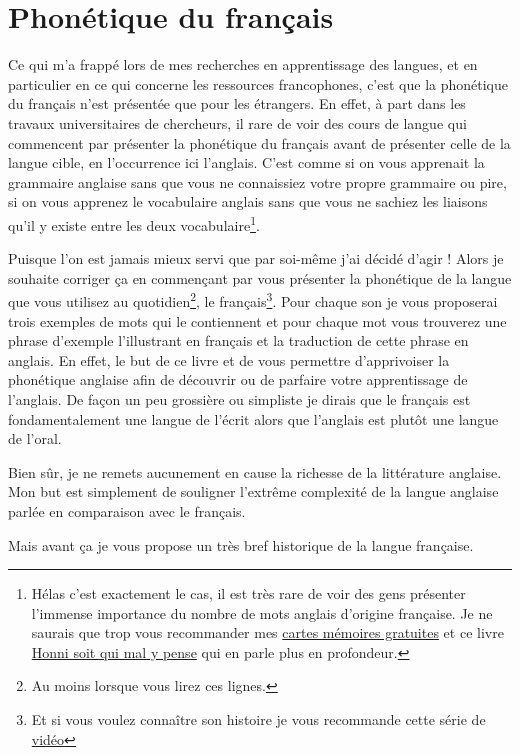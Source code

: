 \documentclass[12pt,a4paper]{book}
\begin{document}
\part{Phonétique du français}
Ce qui m'a frappé lors de mes recherches en apprentissage des langues,
et en particulier en ce qui concerne les ressources francophones,
c'est que la phonétique du français n'est présentée que pour les
étrangers. En effet, à part dans les travaux universitaires de
chercheurs, il rare de voir des cours de langue qui commencent par
présenter la phonétique du français avant de présenter celle de la
langue cible, en l'occurrence ici l'anglais. C'est comme si on vous
apprenait la grammaire anglaise sans que vous ne connaissiez votre
propre grammaire ou pire, si on vous apprenez le vocabulaire anglais
sans que vous ne sachiez les liaisons qu'il y existe entre les deux
vocabulaire\footnote{Hélas c'est exactement le cas, il est très rare
  de voir des gens présenter l'immense importance du nombre de mots
  anglais d'origine française. Je ne saurais que trop vous recommander
mes
\href{https://tinycards.duolingo.com/decks/6VNKUdba/english-words-with-french-origin}{cartes
  mémoires gratuites} et ce livre
\href{https://www.amazon.fr/gp/product/225315444X/ref=as_li_tl?ie=UTF8&camp=1642&creative=6746&creativeASIN=225315444X&linkCode=as2&tag=wwwbecomefree-21&linkId=5317e7b0e063b4d6c7c676b11420e49d}{Honni
  soit qui mal y pense} qui en parle plus en profondeur.}.\par
Puisque l'on est jamais mieux servi que par soi-même j'ai décidé
d'agir ! Alors je souhaite corriger ça en commençant par vous
présenter la phonétique de la langue que vous utilisez au
quotidien\footnote{Au moins lorsque vous lirez ces lignes.}, le
français\footnote{Et si vous voulez connaître son histoire je vous
  recommande cette série de \href{https://www.youtube.com/watch?v=rHSIPt_ehvc&list=PLH2hhYn999aRfv2odG4SozTXCHbZaX_ji}{vidéo}}. Pour
chaque son je vous proposerai trois exemples de mots qui le
contiennent et pour chaque mot vous trouverez une phrase d'exemple
l'illustrant en français et la traduction de cette phrase en
anglais. En effet, le but de ce livre et de vous permettre
d'apprivoiser la phonétique anglaise afin de découvrir ou de parfaire
votre apprentissage de l'anglais. De façon un peu grossière ou
simpliste je dirais que le français est fondamentalement une langue de
l'écrit alors que l'anglais est plutôt une langue de l'oral.\par
Bien sûr, je ne remets aucunement en cause la richesse de la
littérature anglaise. Mon but est simplement de souligner l'extrême
complexité de la langue anglaise parlée en comparaison avec le
français.\par
Mais avant ça je vous propose un très bref historique de la langue
française.
\end{document}
